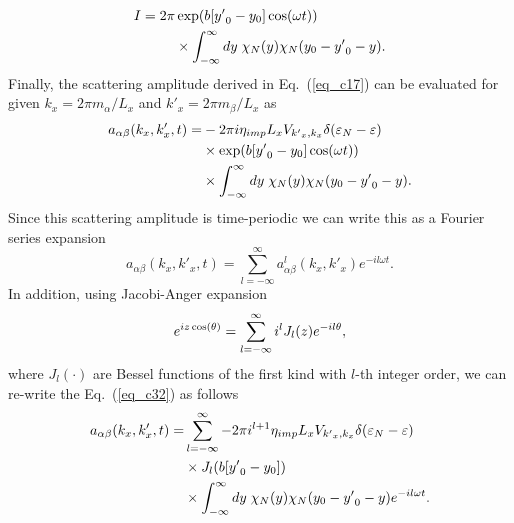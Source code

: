 \begin{equation} \label{eq_c31}
  \begin{aligned}
    I =
    {2\pi} &
    \exp(b[{y'}_0 - y_0]\cos(\omega t)) \\
    & \times
    \int_{-\infty}^{\infty} dy \;
    {\chi}_{N}\qty(y)
    {\chi}_{N}\qty(y_0 - {y'}_0 - y).
  \end{aligned}
\end{equation}
Finally, the scattering amplitude derived in Eq.~(\ref{eq_c17}) can be evaluated for given $k_x = 2\pi m_{\alpha}/L_x$ and $k'_x =  2\pi m_{\beta}/L_x$ as
\begin{equation} \label{eq_c32}
  \begin{aligned}
    a_{\alpha\beta}(k_x,k'_x,t)  =&
    -2\pi i
    \eta_{imp} L_x V_{{k'}_x,k_x}
    \delta(\varepsilon_{N} - \varepsilon)\\
    & \times
    \exp(b[{y'}_0 - y_0]\cos(\omega t))\\
    & \times
    \int_{-\infty}^{\infty} dy \;
    {\chi}_{N}\qty(y)
    {\chi}_{N}\qty(y_0 - {y'}_0 - y).
  \end{aligned}
\end{equation}
Since this scattering amplitude is time-periodic we can write this as a Fourier series expansion
\begin{equation} \label{eq_c33}
    a_{\alpha\beta}(k_x,k'_x,t) =
    \sum_{l=-\infty}^{\infty} a^l_{\alpha\beta}(k_x,k'_x) e^{-il\omega t}.
\end{equation}
In addition, using Jacobi-Anger expansion \cite{cuyt08,abramowitz64}
\begin{equation} \label{eq_c34}
    e^{iz\cos(\theta)} = \sum_{l=-\infty}^{\infty} i^l J_l\qty(z) e^{-il\theta},
\end{equation}
where $J_l(\cdot)$ are Bessel functions of the first kind with $l$-th integer order, we can re-write the Eq.~(\ref{eq_c32}) as follows
\begin{equation} \label{eq_c35}
  \begin{aligned}
    a_{\alpha\beta}(k_x,k'_x,t)  = &
    \sum_{l=-\infty}^{\infty}
    -2\pi i^{l+1}
    \eta_{imp} L_x V_{{k'}_x,k_x}
    \delta(\varepsilon_{N} - \varepsilon)\\
    & \times
    J_l\qty(b[{y'}_0 - y_0]) \\
    & \times
    \int_{-\infty}^{\infty} dy \;
    {\chi}_{N}\qty(y)
    {\chi}_{N}\qty(y_0 - {y'}_0 - y) e^{-il\omega t}.
  \end{aligned}
\end{equation}
